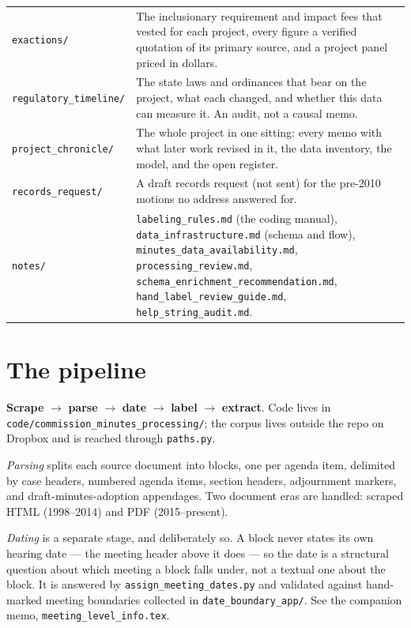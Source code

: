 \documentclass[11pt]{article}
\begin{document}
\begin{longtable}{p{}p{}}
\texttt{exactions/} & The inclusionary requirement and impact fees that vested for each project,
every figure a verified quotation of its primary source, and a project panel priced in dollars. \\
\texttt{regulatory\_timeline/} & The state laws and ordinances that bear on the project, what
each changed, and whether this data can measure it. An audit, not a causal memo. \\
\texttt{project\_chronicle/} & The whole project in one sitting: every memo with what later work
revised in it, the data inventory, the model, and the open register. \\
\texttt{records\_request/} & A draft records request (not sent) for the pre-2010 motions no
address answered for. \\
\texttt{notes/} & \texttt{labeling\_rules.md} (the coding manual),
\texttt{data\_infrastructure.md} (schema and flow), \texttt{minutes\_data\_availability.md},
\texttt{processing\_review.md}, \texttt{schema\_enrichment\_recommendation.md},
\texttt{hand\_label\_review\_guide.md}, \texttt{help\_string\_audit.md}. \\
\bottomrule
\end{longtable}

\section{The pipeline}

\textbf{Scrape} $\to$ \textbf{parse} $\to$ \textbf{date} $\to$ \textbf{label} $\to$
\textbf{extract}. Code lives in \texttt{code/commission\_minutes\_processing/}; the corpus
lives outside the repo on Dropbox and is reached through \texttt{paths.py}.

\emph{Parsing} splits each source document into blocks, one per agenda item, delimited by
case headers, numbered agenda items, section headers, adjournment markers, and
draft-minutes-adoption appendages. Two document eras are handled: scraped HTML
(1998--2014) and PDF (2015--present).

\emph{Dating} is a separate stage, and deliberately so. A block never states its own
hearing date --- the meeting header above it does --- so the date is a structural question
about which meeting a block falls under, not a textual one about the block. It is answered
by \texttt{assign\_meeting\_dates.py} and validated against hand-marked meeting boundaries
collected in \texttt{date\_boundary\_app/}. See the companion memo,
\texttt{meeting\_level\_info.tex}.
\end{document}
